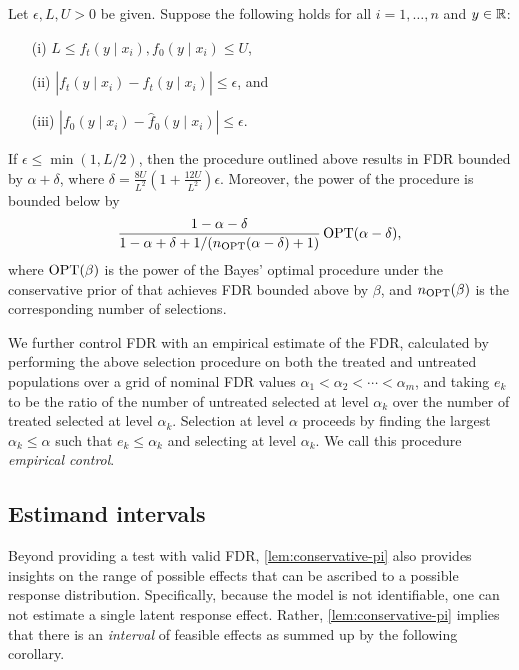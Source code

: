 \begin{theorem}
\label{thm:general-fdr}
Let $\epsilon, L, U > 0$ be given. Suppose the following holds for all $i=1,\ldots, n$ and $y \in \mathbb{R}$:
\begin{itemize}
    \item[(i)] $L \leq f_t(y \mid x_i), f_0(y \mid x_i) \leq U$,
    \item [(ii)] $|f_t(y \mid x_i) - \hat{f}_t(y \mid x_i)| \leq \epsilon$, and
    \item[(iii)] $|f_0(y \mid x_i) - \hat{f}_0(y \mid x_i)| \leq \epsilon$.
\end{itemize}
If $\epsilon \leq \min(1, L/2)$, then the procedure outlined above results in FDR bounded by $\alpha + \delta$, where $\delta = \frac{8U}{L^2} \left( 1 + \frac{12U}{L^2}\right)\epsilon$. 
Moreover, the power of the procedure is bounded below by 
\[ \frac{1-\alpha - \delta}{1-\alpha + \delta + 1/(n_{\operatorname{OPT}}(\alpha - \delta) +1)} \operatorname{OPT}(\alpha - \delta), \]
where $\operatorname{OPT}(\beta)$ is the power of the Bayes' optimal procedure under the conservative prior of  that achieves FDR bounded above by $\beta$, and $n_{\operatorname{OPT}}(\beta)$ is the corresponding number of selections.
\end{theorem}


We further control FDR with an empirical estimate of the FDR, calculated by performing the above selection procedure on both the treated and untreated populations over a grid of nominal FDR values $\alpha_1 < \alpha_2 < \cdots < \alpha_m$, and taking $e_k$ to be the ratio of the number of untreated selected at level $\alpha_k$ over the number of treated selected at level $\alpha_k$. Selection at level $\alpha$ proceeds by finding the largest $\alpha_k \leq \alpha$ such that $e_k \leq \alpha_k$ and selecting at level $\alpha_k$. We call this procedure \emph{empirical control}.

\subsection{Estimand intervals}
\label{subsec:kernel_generalized:estimands}
Beyond providing a test with valid FDR, \cref{lem:conservative-pi} also provides insights on the range of possible effects that can be ascribed to a possible response distribution. Specifically, because the model is not identifiable, one can not estimate a single latent response effect. Rather, \cref{lem:conservative-pi} implies that there is an \emph{interval} of feasible effects as summed up by the following corollary.

